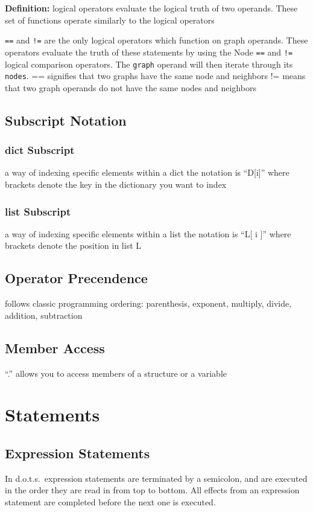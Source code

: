 \documentclass{article}
\newcommand{\pltlang}{d.o.t.s.} %
\newcommand{\code}[1]{\texttt{#1}} %
\begin{document}
\textbf{Definition: } logical operators evaluate the logical truth of two operands. These set of functions operate similarly to the logical operators

\code{==} and \code{!=} are the only logical operators which function on graph operands. These operators evaluate the truth of these statements by using the Node \code{==} and \code{!=} logical comparison operators. The \code{graph} operand will then iterate through its \code{nodes}.
== signifies that two graphs have the same node and neighbors 
!= means that two graph operands do not have the same nodes and neighbors
\subsection{Subscript Notation}

\subsubsection{dict Subscript}
a way of indexing specific elements within a dict the notation is “D[i]” where brackets denote the key in the dictionary you want to index
\subsubsection{list Subscript}
a way of indexing specific elements within a list the notation is “L[ i ]” where brackets denote the position in list L 

\subsection{Operator Precendence}
follows classic programming ordering: parenthesis, exponent, multiply, divide, addition, subtraction
\subsection{Member Access}

 ``.'' allows you to access members of a structure or a variable


\section{Statements}

\subsection{Expression Statements}
In \pltlang\ expression statements are terminated by a semicolon, and are executed in the order they are read in from top to bottom. All effects from an expression statement are completed before the next one is executed.
\end{document}
